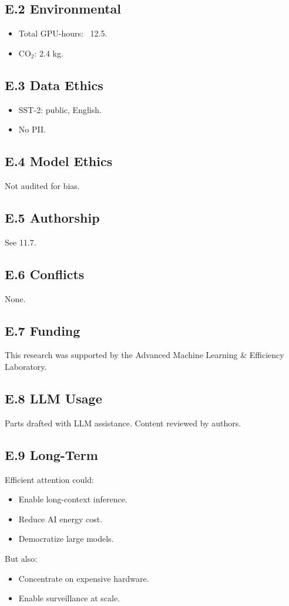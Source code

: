 \subsection{E.2 Environmental}

\begin{itemize}
\item Total GPU-hours: ~12.5.
\item CO$_2$: 2.4 kg.

\end{itemize}
\subsection{E.3 Data Ethics}

\begin{itemize}
\item SST-2: public, English.
\item No PII.

\end{itemize}
\subsection{E.4 Model Ethics}

Not audited for bias.

\subsection{E.5 Authorship}

See  11.7.

\subsection{E.6 Conflicts}

None.

\subsection{E.7 Funding}

This research was supported by the Advanced Machine Learning \& Efficiency Laboratory.

\subsection{E.8 LLM Usage}

Parts drafted with LLM assistance. Content reviewed by authors.

\subsection{E.9 Long-Term}

Efficient attention could:
\begin{itemize}
\item Enable long-context inference.
\item Reduce AI energy cost.
\item Democratize large models.

\end{itemize}
But also:
\begin{itemize}
\item Concentrate on expensive hardware.
\item Enable surveillance at scale.

\end{itemize}
